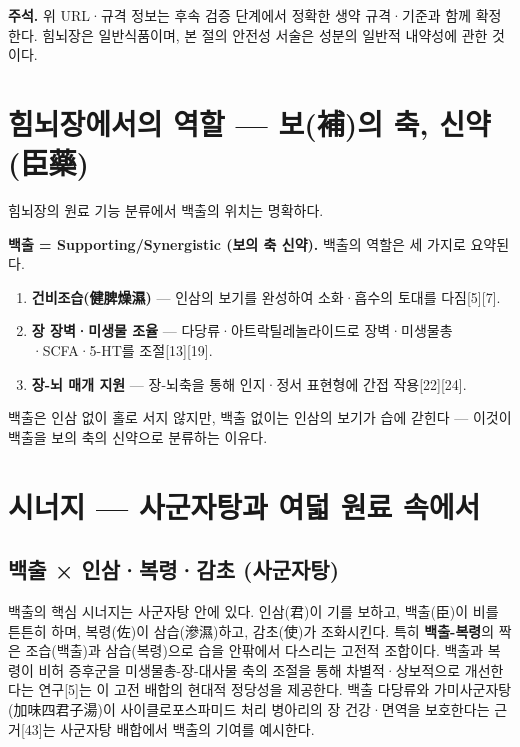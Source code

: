 \documentclass[11pt,oneside]{book}
\newenvironment{authnote}
  {\par\smallskip\begingroup\leftskip=7mm\rightskip=5mm\small\color{muted}\noindent\ignorespaces}
  {\par\endgroup\smallskip}
\begin{document}
\begin{authnote}\textbf{주석.} 위 URL·규격 정보는 후속 검증 단계에서 정확한 생약 규격·기준과 함께 확정한다. 힘뇌장은 일반식품이며, 본 절의 안전성 서술은 성분의 일반적 내약성에 관한 것이다.\end{authnote}
\section{힘뇌장에서의 역할 — 보(補)의 축, 신약(臣藥)}
힘뇌장의 원료 기능 분류에서 백출의 위치는 명확하다.

\vspace{2pt}\vspace{3pt}

\textbf{백출 = Supporting/Synergistic (보의 축 신약).} 백출의 역할은 세 가지로 요약된다.

\begin{enumerate}[leftmargin=6mm,itemsep=1pt,topsep=2pt]
  \item \textbf{건비조습(健脾燥濕)} — 인삼의 보기를 완성하여 소화·흡수의 토대를 다짐[5][7].
  \item \textbf{장 장벽·미생물 조율} — 다당류·아트락틸레놀라이드로 장벽·미생물총·SCFA·5-HT를 조절[13][19].
  \item \textbf{장-뇌 매개 지원} — 장-뇌축을 통해 인지·정서 표현형에 간접 작용[22][24].
\end{enumerate}
백출은 인삼 없이 홀로 서지 않지만, 백출 없이는 인삼의 보기가 습에 갇힌다 — 이것이 백출을 보의 축의 신약으로 분류하는 이유다.

\section{시너지 — 사군자탕과 여덟 원료 속에서}
\subsection{백출 × 인삼·복령·감초 (사군자탕)}
백출의 핵심 시너지는 사군자탕 안에 있다. 인삼(君)이 기를 보하고, 백출(臣)이 비를 튼튼히 하며, 복령(佐)이 삼습(滲濕)하고, 감초(使)가 조화시킨다. 특히 \textbf{백출-복령}의 짝은 조습(백출)과 삼습(복령)으로 습을 안팎에서 다스리는 고전적 조합이다. 백출과 복령이 비허 증후군을 미생물총-장-대사물 축의 조절을 통해 차별적·상보적으로 개선한다는 연구[5]는 이 고전 배합의 현대적 정당성을 제공한다. 백출 다당류와 가미사군자탕(加味四君子湯)이 사이클로포스파미드 처리 병아리의 장 건강·면역을 보호한다는 근거[43]는 사군자탕 배합에서 백출의 기여를 예시한다.
\end{document}
